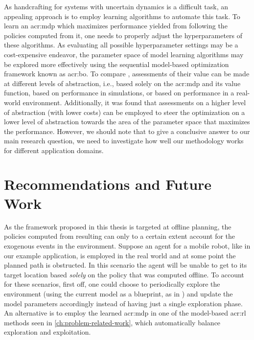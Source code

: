 As handcrafting  for systems with uncertain dynamics is a difficult task, an appealing approach is to employ learning algorithms to automate this task.
To learn an \acrshort{acr:mdp} which maximizes performance yielded from following the policies computed from it, one needs to properly adjust the hyperparameters of these algorithms.
As evaluating all possible hyperparameter settings may be a cost-expensive endeavor, the parameter space of model learning algorithms may be explored more effectively using the sequential model-based optimization framework known as \acrfull{acr:bo}.
To compare , assessments of their value can be made at different levels of abstraction, i.e., based solely on the \acrshort{acr:mdp} and its value function, based on performance in simulations, or based on performance in a real-world environment.
Additionally, it was found that assessments on a higher level of abstraction (with lower costs) can be employed to steer the optimization on a lower level of abstraction towards the area of the parameter space that maximizes the performance.
However, we should note that to give a conclusive answer to our main research question, we need to investigate how well our methodology works for different application domains.

\section{Recommendations and Future Work}
\label{sec:recommendations-future-work}

As the framework proposed in this thesis is targeted at offline planning, the policies computed from resulting  can only to a certain extent account for the exogenous events in the environment.
Suppose an agent for a mobile robot, like in our example application, is employed in the real world and at some point the planned path is obstructed.
In this scenario the agent will be unable to get to its target location based \textit{solely} on the policy that was computed offline.
To account for these scenarios, first off, one could choose to periodically explore the environment (using the current model as a blueprint, as in \cite{epshteyn2008active}) and update the model parameters accordingly instead of having just a single exploration phase.
An alternative is to employ the learned \acrshort{acr:mdp} in one of the model-based \acrshort{acr:rl} methods seen in \autoref{ch:problem-related-work}, which automatically balance exploration and exploitation.

